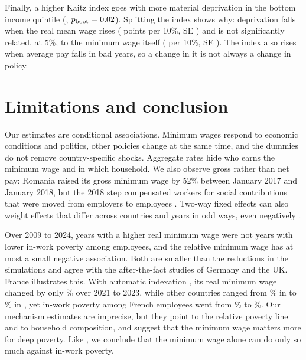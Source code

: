 \documentclass[10pt,a4paper]{article}
\newcommand{\pb}{p_{\text{boot}}}
\begin{document}
Finally, a higher Kaitz index goes with more material deprivation in the bottom income quintile (\DeprK, $\pb=\DeprKPboot$). Splitting the index shows why: deprivation falls when the real mean wage rises (\DeprMeanWage{} points per 10\%, SE \DeprMeanWageSe) and is not significantly related, at 5\%, to the minimum wage itself (\DeprMw{} per 10\%, SE \DeprMwSe). The index also rises when average pay falls in bad years, so a change in it is not always a change in policy.

\section{Limitations and conclusion}

Our estimates are conditional associations. Minimum wages respond to economic conditions and politics, other policies change at the same time, and the dummies do not remove country-specific shocks. Aggregate rates hide who earns the minimum wage and in which household. We also observe gross rather than net pay: Romania raised its gross minimum wage by 52\% between January 2017 and January 2018, but the 2018 step compensated workers for social contributions that were moved from employers to employees \citep{eurofound2018}. Two-way fixed effects can also weight effects that differ across countries and years in odd ways, even negatively \citep{dechaisemartin2020}.

Over 2009 to 2024, years with a higher real minimum wage were not years with lower in-work poverty among employees, and the relative minimum wage has at most a small negative association. Both are smaller than the reductions in the simulations and agree with the after-the-fact studies of Germany and the UK. France illustrates this. With automatic indexation \citep{eurofound2024}, its real minimum wage changed by only \SurgeFr\% over 2021 to 2023, while other countries ranged from \SurgeMin\% in \SurgeMinCountry{} to \SurgeMax\% in \SurgeMaxCountry, yet in-work poverty among French employees went from \FrIwpTwentyOne\% to \FrIwpTwentyThree\%. Our mechanism estimates are imprecise, but they point to the relative poverty line and to household composition, and suggest that the minimum wage matters more for deep poverty. Like \citet{marx2012}, we conclude that the minimum wage alone can do only so much against in-work poverty.
\end{document}

